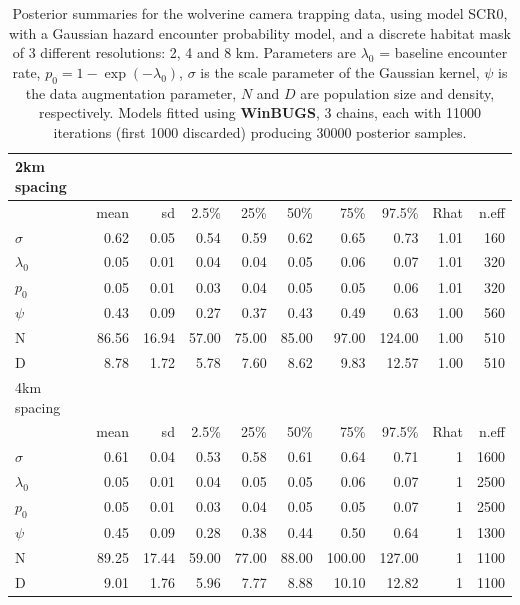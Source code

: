 \begin{table}[ht]
\centering
\caption{
Posterior summaries for the wolverine camera trapping data, using
model SCR0, with a Gaussian hazard encounter probability model, and a discrete habitat mask of 3 different resolutions: 2,
4 and 8 km. Parameters are $\lambda_{0}$ = baseline encounter rate,
$p_{0} = 1-\exp(-\lambda_{0})$, $\sigma$ is the scale parameter of the
Gaussian kernel, $\psi$ is the data augmentation parameter, $N$ and
$D$ are population size and density, respectively.
Models fitted using {\bf WinBUGS}, 
  3 chains, each with 11000 iterations (first 1000 discarded)
producing  30000 posterior samples. 
}
\begin{tabular}{l r r r r r r r r r}
  \hline \hline
  2km spacing & & & & & & & & &\\
  \hline
  &   mean &   sd &  2.5\% &  25\% &  50\% &  75\% &  97.5\% &  Rhat &
  n.eff \\ \hline
  $\sigma$ &  0.62 &  0.05 &  0.54 &  0.59 &  0.62 &  0.65 &  0.73 &  1.01 &  160 \\
  $\lambda_0$ & 0.05 & 0.01 &  0.04 &  0.04 &  0.05 &  0.06 & 0.07 &  1.01 & 320 \\
  $p_0$  &  0.05 &  0.01 & 0.03 & 0.04 & 0.05 & 0.05 &  0.06 & 1.01 & 320 \\
  $\psi$ &   0.43 &  0.09 &  0.27 &  0.37 &  0.43 &  0.49  &  0.63 &  1.00 &  560 \\
  N & 86.56 & 16.94 & 57.00 & 75.00 & 85.00 & 97.00 & 124.00 & 1.00 & 510 \\
  D & 8.78 &  1.72 & 5.78 & 7.60 & 8.62 & 9.83 & 12.57 & 1.00 & 510 \\
  \hline
  4km spacing & & & & & & & & &\\
  \hline
  &   mean &   sd &  2.5\% &  25\% &  50\% &  75\% &  97.5\% &  Rhat &
  n.eff \\ \hline
  $\sigma$ & 0.61 & 0.04 & 0.53 & 0.58 & 0.61 &  0.64 &  0.71 &   1 & 1600 \\
  $\lambda_0$ &  0.05 & 0.01 & 0.04 & 0.05 & 0.05 &  0.06 &  0.07 &   1 & 2500 \\
  $p_0$  &   0.05 & 0.01 & 0.03 & 0.04 & 0.05 &  0.05 &  0.07 &   1 & 2500 \\
  $\psi$ &   0.45 & 0.09 & 0.28 & 0.38 & 0.44 &  0.50 &  0.64 &   1 & 1300 \\
  N  &   89.25 & 17.44 &  59.00 & 77.00 & 88.00 & 100.00 & 127.00  &  1 & 1100 \\
  D  &    9.01 & 1.76 & 5.96 & 7.77 & 8.88 & 10.10 & 12.82  &  1 & 1100 \\

\end{tabular}
\end{table}
